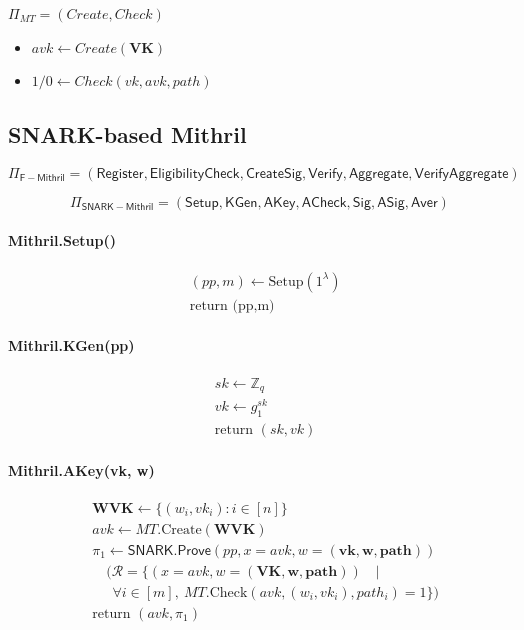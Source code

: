 \documentclass{article}
\begin{document}
$\Pi_{MT} = (Create,Check)$

\begin{itemize}
    \item $avk \leftarrow Create(\mathbf{VK})$
    \item $1/0 \leftarrow Check(vk,avk,path)$
\end{itemize}

\subsection{SNARK-based Mithril}


\[
\Pi_{\mathsf{F-Mithril}}
= (\mathsf{Register},
   \mathsf{EligibilityCheck}, \mathsf{CreateSig}, \mathsf{Verify},
   \mathsf{Aggregate}, \mathsf{VerifyAggregate})
\]

\[
\Pi_{\mathsf{SNARK-Mithril}}
= (\mathsf{Setup}, \mathsf{KGen}, \mathsf{AKey},
   \mathsf{ACheck},
   \mathsf{Sig}, \mathsf{ASig}, \mathsf{Aver})
\]

\paragraph{Mithril.Setup(\lambda)}
\begin{align*}
&(pp,m) \leftarrow \text{Setup}(1^\lambda)\\
&\text{return  (pp,m) }
\end{align*}

\paragraph{Mithril.KGen(pp)}
\begin{align*}
&sk \leftarrow \mathbb{Z}_q \\
&vk \leftarrow g_1^{sk} \\
&\text{return } (sk, vk)
\end{align*}

\paragraph{Mithril.AKey(\textbf{vk}, \textbf{w})}
\begin{align*}
&\textbf{WVK} \leftarrow \{(w_i, vk_i) : i \in [n]\} \\
&avk \leftarrow MT.\mathrm{Create}(\textbf{WVK}) \\
&\pi_1 \leftarrow \mathsf{SNARK.Prove}(pp, x = avk, w = (\textbf{vk}, \textbf{w}, \textbf{path})) \\
&\quad (\mathcal{R} = \{(x = avk, w = (\textbf{VK}, \textbf{w}, \textbf{path}))\quad |\\ & \quad \ \ \forall i \in [m],\ MT.\mathrm{Check}(avk, (w_i, vk_i), path_i) = 1 \}) \\
&\text{return } (avk,\pi_1)
\end{align*}
\end{document}
